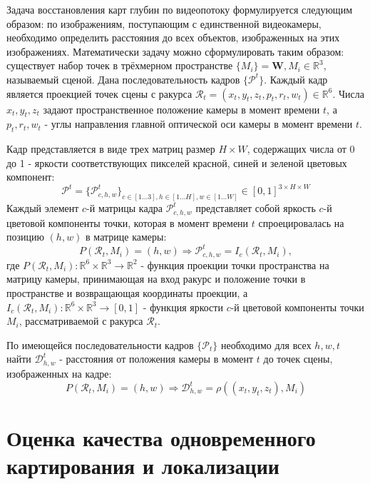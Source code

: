 \documentclass{mipt-thesis-ms}
\begin{document}
	Задача восстановления карт глубин по видеопотоку формулируется следующим образом: по изображениям, поступающим с единственной видеокамеры, необходимо определить расстояния до всех объектов, изображенных на этих изображениях. Математически задачу можно сформулировать таким образом: существует набор точек в трёхмерном пространстве $\{M_i \} = \textbf{W}, M_i \in \mathbb{R}^3$, называемый сценой. Дана последовательность кадров $\{\mathcal{P}^t\}$. Каждый кадр является проекцией точек сцены с ракурса $\mathcal{R}_t = (x_t, y_t, z_t, p_t, r_t, w_t) \in \mathbb{R}^6$. Числа $x_t, y_t, z_t$ задают пространственное положение камеры в момент времени $t$, а $p_t, r_t, w_t$ - углы направления главной оптической оси камеры в момент времени $t$.
	
	Кадр представляется в виде трех матриц размер $H \times W$, содержащих числа от 0 до 1 - яркости соответствующих пикселей красной, синей и зеленой цветовых компонент:
	$$\mathcal{P}^t = \{\mathcal{P}^t_{c,h,w}\}_{c \in [1 \dots 3], h \in [1 \dots H], w \in [1 \dots W]} \in [0, 1]^{3 \times H \times W}$$
	Каждый элемент $c$-й матрицы кадра $\mathcal{P}^t_{c,h,w}$ представляет собой яркость $c$-й цветовой компоненты точки, которая в момент времени $t$ спроецировалась на позицию $(h, w)$ в матрице камеры:
	$$P(\mathcal{R}_t, M_i) = (h, w) \Rightarrow \mathcal{P}^t_{c,h,w} = I_c(\mathcal{R}_t, M_i),$$
	где $P(\mathcal{R}_t, M_i): \mathbb{R}^6 \times \mathbb{R}^3 \rightarrow \mathbb{R}^2$ - функция проекции точки пространства на матрицу камеры, принимающая на вход ракурс и положение точки в пространстве и возвращающая координаты проекции, а $I_c (\mathcal{R}_t, M_i): \mathbb{R}^6 \times \mathbb{R}^3 \rightarrow [0, 1]$ - функция яркости $c$-й цветовой компоненты точки $M_i$, рассматриваемой с ракурса $\mathcal{R}_t$.
	
	По имеющейся последовательности кадров $\{\mathcal{P}_t\}$ необходимо для всех $h,w,t$ найти $\mathcal{D}^t_{h,w}$ - расстояния от положения камеры в момент $t$ до точек сцены, изображенных на кадре:
	$$P(\mathcal{R}_t, M_i) = (h, w) \Rightarrow \mathcal{D}^t_{h,w} = \rho((x_t, y_t, z_t), M_i)$$
	
		
	\chapter{Оценка качества одновременного картирования и локализации}
	
\end{document}
